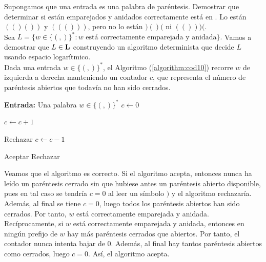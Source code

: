 \begin{ejercicio}
    Supongamos que una entrada es una palabra de paréntesis. 
    Demostrar que determinar si están emparejados y anidados correctamente 
    está en \Loga. Lo están $(()())$ y $((()))$, pero no lo están $)()($ ni 
    $(()))($. \\

    Sea $L=\{w\in \{(,)\}^{*} : w \text{ está correctamente emparejada y anidada}\}.$
    Vamos a demostrar que $L\in \textbf{L}$ construyendo un algoritmo determinista que decide $L$ usando espacio logarítmico. \\

    Dada una entrada $w\in \{(,)\}^{*}$, el Algoritmo (\ref{algorithm:cod10}) recorre $w$ de izquierda a derecha manteniendo un contador $c$, 
    que representa el número de paréntesis abiertos que todavía no han sido cerrados. \\

    \begin{algorithm}
        \caption{Algoritmo para paréntesis bien anidados}
        \label{algorithm:cod10}
        \begin{algorithmic}
            \State \textbf{Entrada:} Una palabra $w\in \{(,)\}^{*}$
            \State $c \gets 0$

                    \State $c \gets c+1$
                \EndIf

                        \State Rechazar
                    \Else
                        \State $c \gets c-1$
                    \EndIf
                \EndIf
            \EndFor

                \State Aceptar
            \Else
                \State Rechazar
            \EndIf
        \end{algorithmic}
    \end{algorithm}

    Veamos que el algoritmo es correcto. Si el algoritmo acepta, entonces nunca ha leído un paréntesis cerrado sin 
    que hubiese antes un paréntesis abierto disponible, pues en tal caso se tendría $c=0$ al leer un símbolo $)$ y el algoritmo rechazaría. 
    Además, al final se tiene $c=0$, luego todos los paréntesis abiertos han sido cerrados. Por tanto, $w$ está correctamente emparejada y anidada. \\

    Recíprocamente, si $w$ está correctamente emparejada y anidada, entonces en ningún prefijo de $w$ hay más 
    paréntesis cerrados que abiertos. Por tanto, el contador nunca intenta bajar de $0$. Además, al final hay tantos paréntesis abiertos como 
    cerrados, luego $c=0$. Así, el algoritmo acepta. \\


\end{ejercicio}
